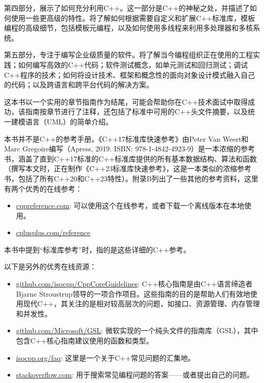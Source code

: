 第四部分，展示了如何充分利用C++。这一部分是C++的神秘之处，并描述了如何使用一些更高级的特性。将了解如何根据需要自定义和扩展C++标准库，模板编程的高级细节，包括模板元编程，以及如何使用多线程来利用多处理器和多核系统。

第五部分，专注于编写企业级质量的软件。将了解当今编程组织正在使用的工程实践；如何编写高效的C++代码；软件测试概念，如单元测试和回归测试；调试C++程序的技术；如何将设计技术、框架和概念性的面向对象设计模式融入自己的代码；以及跨语言和跨平台代码的解决方案。

这本书以一个实用的章节指南作为结尾，可能会帮助你在C++技术面试中取得成功，该指南按章节进行了注释，还包括了标准中可用的C++头文件摘要，以及统一建模语言（UML）的简单介绍。

本书并不是C++的参考手册。《C++17标准库快速参考》由Peter Van Weert和Marc Gregoire编写（Apress, 2019. ISBN: 978-1-4842-4923-9）是一本浓缩的参考书，涵盖了直到C++17标准的C++标准库提供的所有基本数据结构、算法和函数（撰写本文时，正在制作《C++23标准库快速参考》，这是一本类似的浓缩参考书，包括了所有C++20和C++23特性）。附录B列出了一些其他的参考资料，这里有两个优秀的在线参考：

\begin{itemize}
\item
\href{http://cppreference.com/}{cppreference.com}: 可以使用这个在线参考，或者下载一个离线版本在本地使用。

\item
\href{http://cplusplus.com/reference}{cplusplus.com/reference}
\end{itemize}

本书中提到“标准库参考”时，指的是这些详细的C++参考。

以下是另外的优秀在线资源：

\begin{itemize}
\item
\href{http://github.com/isocpp/CppCoreGuidelines}{github.com/isocpp/CppCoreGuidelines}: C++核心指南是由C++语言缔造者Bjarne Stroustrup领导的一项合作项目。这些指南的目的是帮助人们有效地使用现代C++，其关注的是相对较高层次的问题，如接口、资源管理、内存管理和并发性。

\item
\href{http://github.com/Microsoft/GSL}{github.com/Microsoft/GSL}: 微软实现的一个纯头文件的指南库（GSL），其中包含C++核心指南建议使用的函数和类型。

\item
\href{http://isocpp.org/faq}{isocpp.org/faq}: 这里是一个关于C++常见问题的汇集地。

\item
\href{http://stackoverflow.com/}{stackoverflow.com}: 用于搜索常见编程问题的答案——或者提出自己的问题。
\end{itemize}

